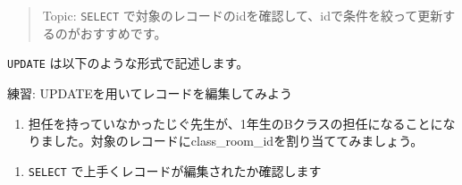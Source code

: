 \begin{quote}
Topic: \texttt{SELECT}
で対象のレコードのidを確認して、idで条件を絞って更新するのがおすすめです。
\end{quote}

\texttt{UPDATE} は以下のような形式で記述します。

\begin{Shaded}
\begin{Highlighting}[]
\OperatorTok{=}\OperatorTok{=}
\end{Highlighting}
\end{Shaded}

練習: UPDATEを用いてレコードを編集してみよう

\begin{enumerate}
\def\labelenumi{\arabic{enumi}.}
\tightlist
\item
  担任を持っていなかったじぐ先生が、1年生のBクラスの担任になることになりました。対象のレコードにclass\_room\_idを割り当ててみましょう。
\end{enumerate}

\begin{Shaded}
\begin{Highlighting}[]
\NormalTok{\# }
 \OperatorTok{*} \OperatorTok{=}  \OperatorTok{=} \NormalTok{;}

 \OperatorTok{*} \OperatorTok{=} \NormalTok{;}

\OperatorTok{=} 
  \OperatorTok{=}
\end{Highlighting}
\end{Shaded}

\begin{enumerate}
\def\labelenumi{\arabic{enumi}.}
\setcounter{enumi}{1}
\tightlist
\item
  \texttt{SELECT} で上手くレコードが編集されたか確認します
\end{enumerate}

